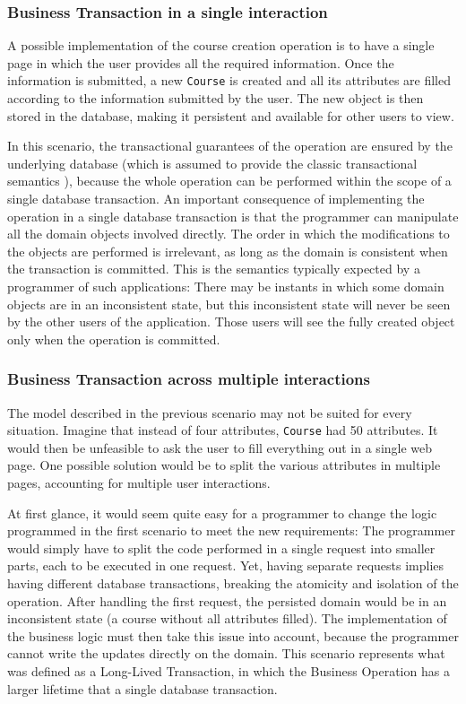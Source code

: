 \documentclass{llncs}
\begin{document}
\subsubsection{Business Transaction in a single interaction}

A possible implementation of the course creation operation is to have
a single page in which the user provides all the required
information. Once the information is submitted, a new \texttt{Course}
is created and all its attributes are filled according to the
information submitted by the user. The new object is then stored in
the database, making it persistent and available for other users to
view.

In this scenario, the transactional guarantees of the operation are
ensured by the underlying database (which is assumed to provide the
classic transactional semantics \cite{gray1981transaction}), because
the whole operation can be performed within the scope of a single
database transaction. An important consequence of implementing the
operation in a single database transaction is that the programmer can
manipulate all the domain objects involved directly. The order in
which the modifications to the objects are performed is irrelevant, as
long as the domain is consistent when the transaction is
committed. This is the semantics typically expected by a programmer of
such applications: There may be instants in which some domain objects
are in an inconsistent state, but this inconsistent state will never
be seen by the other users of the application. Those users will see
the fully created object only when the operation is committed.

\subsubsection{Business Transaction across multiple interactions}

The model described in the previous scenario may not be suited for
every situation. Imagine that instead of four attributes,
\texttt{Course} had 50 attributes. It would then be unfeasible to ask
the user to fill everything out in a single web page. One possible
solution would be to split the various attributes in multiple pages,
accounting for multiple user interactions. 

At first glance, it would seem quite easy for a programmer to change
the logic programmed in the first scenario to meet the new
requirements: The programmer would simply have to split the code
performed in a single request into smaller parts, each to be executed
in one request. Yet, having separate requests implies having different
database transactions, breaking the atomicity and isolation of the
operation. After handling the first request, the persisted domain
would be in an inconsistent state (a course without all attributes
filled). The implementation of the business logic must then take this
issue into account, because the programmer cannot write the updates
directly on the domain. This scenario represents what was defined as a
Long-Lived Transaction, in which the Business Operation has a larger
lifetime that a single database transaction.
\end{document}

